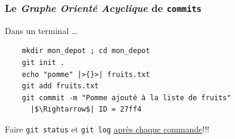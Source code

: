 \documentclass[table,tikz,12pt,svgnames]{beamer}
\begin{document}
\begin{frame}[fragile]
\frametitle{Le \textit{Graphe Orienté Acyclique} de \texttt{commits}}
 	\begin{figure}
	\end{figure}

	\begin{block}{Dans un terminal \ldots}
	\vspace{-0.2cm}		
	\begin{verbatim}
	mkdir mon_depot ; cd mon_depot
	git init .
	echo "pomme" |>{}>| fruits.txt
	git add fruits.txt
	git commit -m "Pomme ajouté à la liste de fruits"
	  |$\Rightarrow$| ID = 27ff4
	\end{verbatim}
	\end{block}
	Faire \texttt{git status} et \texttt{git log} \underline{après chaque commande}!!!
\end{frame}
\end{document}
